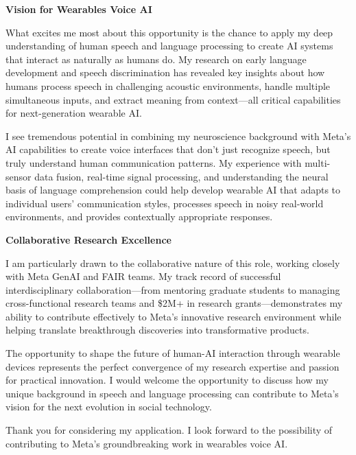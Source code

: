 \documentclass[10.5pt, letterpaper]{russell}
\begin{document}
\begin{cvletter}
  \textbf{Vision for Wearables Voice AI}

  What excites me most about this opportunity is the chance to apply my deep understanding of human speech and language processing to create AI systems that interact as naturally as humans do. My research on early language development and speech discrimination has revealed key insights about how humans process speech in challenging acoustic environments, handle multiple simultaneous inputs, and extract meaning from context—all critical capabilities for next-generation wearable AI.

  I see tremendous potential in combining my neuroscience background with Meta's AI capabilities to create voice interfaces that don't just recognize speech, but truly understand human communication patterns. My experience with multi-sensor data fusion, real-time signal processing, and understanding the neural basis of language comprehension could help develop wearable AI that adapts to individual users' communication styles, processes speech in noisy real-world environments, and provides contextually appropriate responses.

  \textbf{Collaborative Research Excellence}

  I am particularly drawn to the collaborative nature of this role, working closely with Meta GenAI and FAIR teams. My track record of successful interdisciplinary collaboration—from mentoring graduate students to managing cross-functional research teams and \$2M+ in research grants—demonstrates my ability to contribute effectively to Meta's innovative research environment while helping translate breakthrough discoveries into transformative products.

  The opportunity to shape the future of human-AI interaction through wearable devices represents the perfect convergence of my research expertise and passion for practical innovation. I would welcome the opportunity to discuss how my unique background in speech and language processing can contribute to Meta's vision for the next evolution in social technology.

  Thank you for considering my application. I look forward to the possibility of contributing to Meta's groundbreaking work in wearables voice AI.

\end{cvletter}

\makeletterclosing
\end{document}
